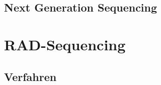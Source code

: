 

\subsection{Next Generation Sequencing} \label{subsec:ngs}
\section{RAD-Sequencing} \label{sec:rad}

%
%
%
%
%
%
%
%
%
%
%
\subsection{Verfahren}\label{subsec:rad_protocol}
